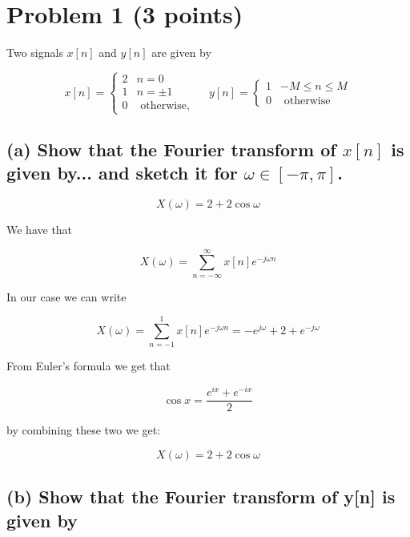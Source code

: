 \section{Problem 1 (3 points)}
Two signals $x[n]$ and $y[n]$ are given by


\begin{equation*}
    x[n]=\left\{\begin{array}{ll}2 & n=0 \\ 1 & n= \pm 1 \\ 0 & \text { otherwise, }\end{array} \quad y[n]=\left\{\begin{array}{ll}1 & -M \leq n \leq M \\ 0 & \text { otherwise }\end{array}\right.\right. 
\end{equation*}

\subsection*{(a) Show that the Fourier transform of $x[n]$ is given by... and sketch it for $\omega \in [-\pi , \pi]$.}

\begin{equation*}
    X(\omega)=2+2 \cos{\omega}
\end{equation*}

We have that

\begin{equation*}
    X(\omega)=\sum_{n=-\infty}^\infty x[n]e^{-j\omega n}
\end{equation*}

In our case we can write

\begin{equation*}
    X(\omega)=\sum_{n=-1}^1 x[n]e^{-j\omega n} = -e^{j\omega}+ 2 + e^{-j\omega}
\end{equation*}

From Euler's formula we get that

\begin{equation*}
    \cos{x} = \frac{e^{ix}+e^{-ix}}{2}
\end{equation*}

by combining these two we get:

\begin{equation*}
    X(\omega)=2+2 \cos{\omega}
\end{equation*}


\subsection*{(b) Show that the Fourier transform of y[n] is given by}

